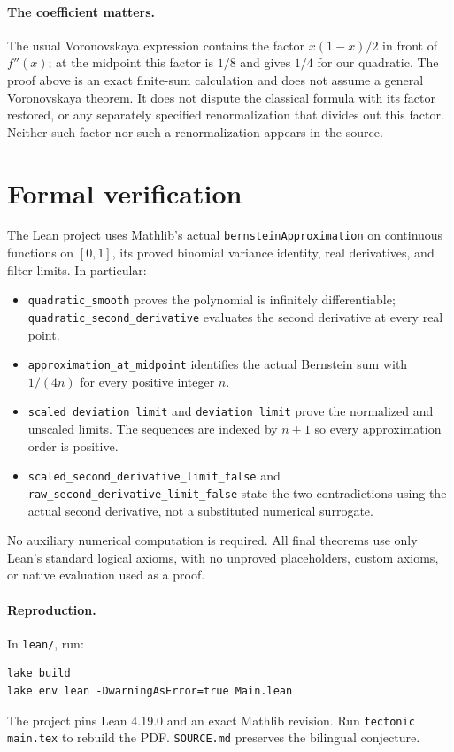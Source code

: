 \documentclass[11pt]{article}
\begin{document}
\paragraph{The coefficient matters.}
The usual Voronovskaya expression contains the factor $x(1-x)/2$ in front
of $f''(x)$; at the midpoint this factor is $1/8$ and gives $1/4$ for our
quadratic. The proof above is an exact finite-sum calculation and does not
assume a general Voronovskaya theorem. It does not dispute the classical
formula with its factor restored, or any separately specified
renormalization that divides out this factor. Neither such factor nor
such a renormalization appears in the source.

\section{Formal verification}
The Lean project uses Mathlib's actual \texttt{bernsteinApproximation}
on continuous functions on $[0,1]$, its proved binomial variance identity,
real derivatives, and filter limits. In particular:
\begingroup\raggedright
\begin{itemize}
\item \texttt{quadratic\_\allowbreak smooth} proves the polynomial is infinitely
      differentiable; \texttt{quadratic\_\allowbreak second\_\allowbreak derivative} evaluates
      the second derivative at every real point.
\item \texttt{approximation\_\allowbreak at\_\allowbreak midpoint} identifies the actual
      Bernstein sum with $1/(4n)$ for every positive integer $n$.
\item \texttt{scaled\_\allowbreak deviation\_\allowbreak limit} and \texttt{deviation\_\allowbreak limit}
      prove the normalized and unscaled limits. The sequences are indexed
      by $n+1$ so every approximation order is positive.
\item \texttt{scaled\_\allowbreak second\_\allowbreak derivative\_\allowbreak limit\_\allowbreak false} and
      \texttt{raw\_\allowbreak second\_\allowbreak derivative\_\allowbreak limit\_\allowbreak false} state the two
      contradictions using the actual second derivative, not a
      substituted numerical surrogate.
\end{itemize}
\endgroup
No auxiliary numerical computation is required. All final theorems use
only Lean's standard logical axioms, with no unproved placeholders,
custom axioms, or native evaluation used as a proof.

\paragraph{Reproduction.}
In \texttt{lean/}, run:
\begin{verbatim}
lake build
lake env lean -DwarningAsError=true Main.lean
\end{verbatim}
The project pins Lean 4.19.0 and an exact Mathlib revision.
Run \texttt{tectonic main.tex} to rebuild the PDF.
\texttt{SOURCE.md} preserves the bilingual conjecture.
\end{document}
